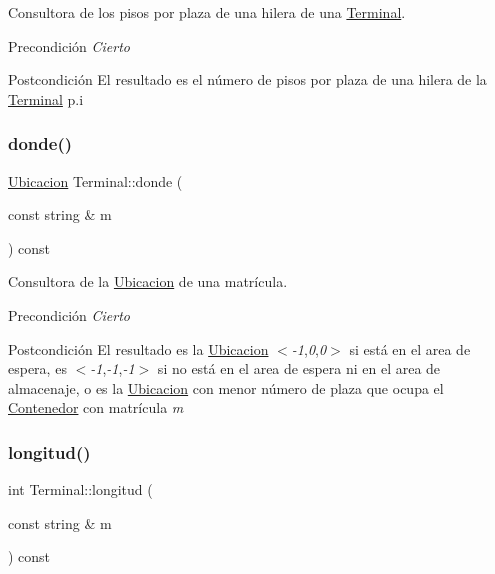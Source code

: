 Consultora de los pisos por plaza de una hilera de una \hyperlink{class_terminal}{Terminal}. 

\begin{DoxyPrecond}{Precondición}
{\itshape Cierto} 
\end{DoxyPrecond}
\begin{DoxyPostcond}{Postcondición}
El resultado es el número de pisos por plaza de una hilera de la \hyperlink{class_terminal}{Terminal} p.\+i 
\end{DoxyPostcond}
\mbox{\label{class_terminal_a2847cb58fe61bb488f089bc67a1973fe}} 
\subsubsection{\texorpdfstring{donde()}{donde()}}
{\footnotesize\ttfamily \hyperlink{class_ubicacion}{Ubicacion} Terminal\+::donde (\begin{DoxyParamCaption}\item[{const string \&}]{m }\end{DoxyParamCaption}) const}



Consultora de la \hyperlink{class_ubicacion}{Ubicacion} de una matrícula. 

\begin{DoxyPrecond}{Precondición}
{\itshape Cierto} 
\end{DoxyPrecond}
\begin{DoxyPostcond}{Postcondición}
El resultado es la \hyperlink{class_ubicacion}{Ubicacion} $<${\itshape -\/1},{\itshape 0},{\itshape 0}$>$ si está en el area de espera, es $<${\itshape -\/1},{\itshape -\/1},{\itshape -\/1}$>$ si no está en el area de espera ni en el area de almacenaje, o es la \hyperlink{class_ubicacion}{Ubicacion} con menor número de plaza que ocupa el \hyperlink{class_contenedor}{Contenedor} con matrícula {\itshape m} 
\end{DoxyPostcond}
\mbox{\label{class_terminal_afc6d0f22bcc642c6ac4355e0b02a7d79}} 
\subsubsection{\texorpdfstring{longitud()}{longitud()}}
{\footnotesize\ttfamily int Terminal\+::longitud (\begin{DoxyParamCaption}\item[{const string \&}]{m }\end{DoxyParamCaption}) const}



